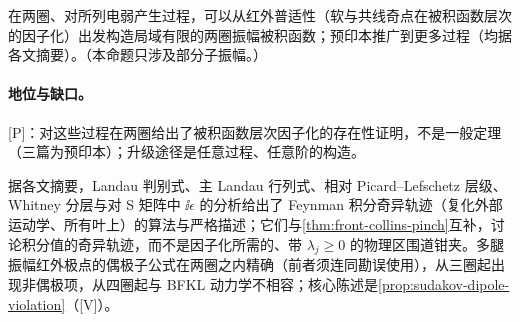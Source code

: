 \begin{proposition}\label{prop:front-local-ir}
在两圈、对所列电弱产生过程，可以从红外普适性（软与共线奇点在被积函数层次的因子化）出发构造局域有限的两圈振幅被积函数\cite{Anastasiou:2018rib,Anastasiou:2020sdt,Anastasiou:2022eym,Anastasiou:2024xvk}；预印本\cite{Anastasiou:2025cvy,Anastasiou:2026kpm,Anastasiou:2026jta}推广到更多过程（均据各文摘要）。（本命题只涉及部分子振幅。）
\end{proposition}

\paragraph{地位与缺口。}[P]：对这些过程在两圈给出了被积函数层次因子化的存在性证明，不是一般定理（三篇为预印本）；升级途径是任意过程、任意阶的构造。

\begin{remark}\label{rem:front-landau-algebraic}
据各文摘要，Landau 判别式\cite{Mizera:2021icv}、主 Landau 行列式\cite{Fevola:2023kaw,Fevola:2023fzn}、相对 Picard--Lefschetz 层级\cite{Berghoff:2022mqu}、Whitney 分层\cite{Helmer:2024wax}与对 S 矩阵中 $\ii\epsilon$ 的分析\cite{Hannesdottir:2022bmo}给出了 Feynman 积分奇异轨迹（复化外部运动学、所有叶上）的算法与严格描述；它们与\cref{thm:front-collins-pinch}互补，讨论积分值的奇异轨迹，而不是因子化所需的、带 $\lambda_j\ge0$ 的物理区围道钳夹。多腿振幅红外极点的偶极子公式在两圈之内精确\cite{Becher:2009cu,Gardi:2009qi}（前者须连同勘误使用），从三圈起出现非偶极项\cite{Almelid:2015jia}，从四圈起与 BFKL 动力学不相容\cite[第~4~节]{Caron-Huot:2013fea}；核心陈述是\cref{prop:sudakov-dipole-violation}（[V]）。
\end{remark}

